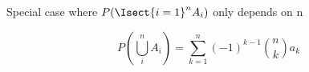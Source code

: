 \documentclass[10pt,twocolumn,letterpaper]{article}
\begin{document}
\begin{comment}
remain = 1

for A, B in ut.combinations(events, 2):
    overlap = rand()
    # what probs are already accounted for
    # accounted = sum([cond[A|C] * marg[C] for C in events if A|C in cond])
    cond[A|B] = (1 - accounted) * overlap

# Find the opposite way using bayes rule
for key, val in conditionals.items():
    A, B = key.split()
    cond[B|A] = val * marg[B] / marg[A]
print('cond = %
    
conditional_events = [A, B, C]

a1 = .1
a2 = .2
a3 = .3
a = [float('nan'), .1, .01, .01]
for n in range(1, len(a)):
    P_any_out_c = sum(ut.choose(n, k) * a[k] for k in range(1, n + 1))
    print('n = %
    print('P_any_out_c = %

\end{comment}

Special case where $P(\Isect{i=1}^n A_i)$ only depends on n

\begin{equation}
    P(\bigcup_i^n A_i) = \sum_{k = 1}^n (-1)^{k-1} \binom{n}{k} a_k
\end{equation}
\end{document}
